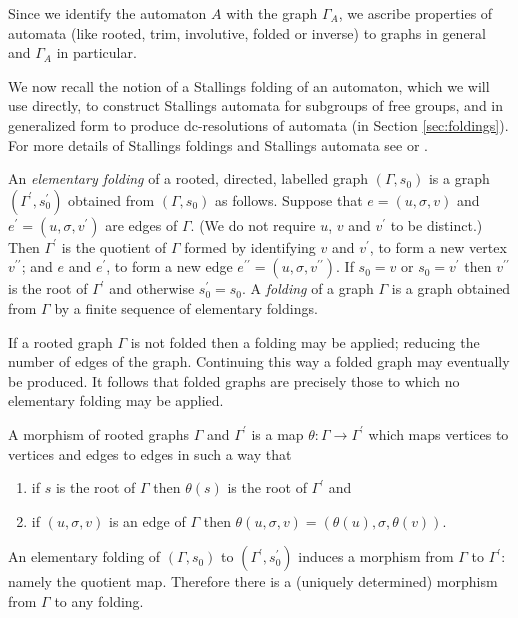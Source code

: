 \documentclass[a4paper,12pt]{article}
\newcommand{\G}{\Gamma }
\newcommand{\s}{\sigma }
\numberwithin{equation}{section}
\numberwithin{figure}{section}
\newcommand{\maps}{\rightarrow}
\newcommand{\be}{\begin{enumerate}}
\newcommand{\ee}{\end{enumerate}}
\begin{document}
Since we identify the automaton $A$ with the graph $\G_A$, we ascribe
properties of automata (like rooted, trim, involutive, folded or
inverse) to graphs in general and $\G_A$ in particular.

We now recall the notion of a Stallings folding of an
automaton, which we will use directly, to construct Stallings 
automata for subgroups of free groups, and in generalized form
to produce dc-resolutions of automata (in Section
\ref{sec:foldings}). For more details of Stallings foldings  and  Stallings 
automata  see \cite{ventura11} or \cite{BartholdiSilva}.

An {\em elementary folding} of a rooted, directed, labelled 
graph $(\G,s_0)$ is a
graph $(\G^\prime,s^\prime_0)$ obtained from $(\G,s_0)$ as
follows. Suppose that $e=(u, \s, v)$ and $e^\prime=(u, \s,
v^\prime)$ are edges of $\G$. (We do not require $u$, $v$ and
$v^\prime$ to be distinct.)
 Then $\G^\prime$ is the quotient of $\G$ formed by identifying
$v$ and $v^\prime$, to form a new vertex $v^{\prime\prime}$; and
$e$ and $e^\prime$, to form a new edge $e^{\prime\prime}=(u, \s,
v^{\prime\prime})$. If $s_0= v$ or $s_0 = v^\prime$ then
$v^{\prime\prime}$ is the root of $\G^\prime$ and otherwise
$s^\prime_0=s_0$.
 A {\em folding} of a graph $\G$ is a graph obtained
from $\G$ by a finite sequence of elementary foldings. 

If a rooted graph $\G$ is not folded then a folding may be applied; reducing the 
number of edges of the graph. Continuing this way a folded graph may eventually 
be produced. It follows that  folded graphs are precisely those 
to which no elementary folding may be applied. 

A morphism of  rooted 
graphs $\G$ and $\G^\prime$ is a map $\theta: \G\maps \G^\prime$ 
which maps vertices to vertices and edges to edges in such a way
that
\be
\item if $s$ is the root of $\G$ then $\theta(s)$ is the root of 
$\G^\prime$ and 
\item  if $(u,\sigma,v)$ is an edge of $\G$ then 
$\theta(u,\sigma,v)=(\theta(u),\sigma,\theta(v))$. 
\ee
An elementary
folding of  $(\G,s_0)$ to  $(\G^\prime,s^\prime_0)$ induces a morphism
from $\G$ to $\G^\prime$: namely the quotient map. Therefore there is
 a (uniquely determined) morphism from $\G$ to any folding.  
\end{document}
